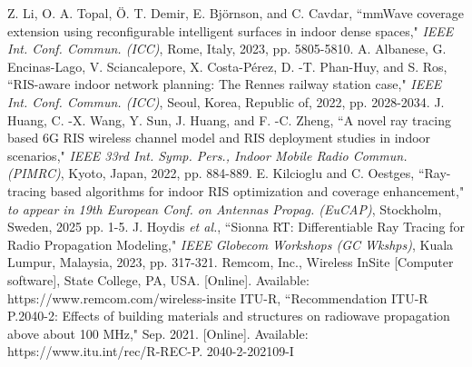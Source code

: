 \documentclass{IEEEoj}
\begin{document}
\begin{thebibliography}{00}
	 Z. Li, O. A. Topal, Ö. T. Demir, E. Björnson, and C. Cavdar, “mmWave coverage extension using reconfigurable intelligent surfaces in indoor dense spaces," \textit{IEEE Int. Conf. Commun. (ICC)}, Rome, Italy, 2023, pp. 5805-5810.
	 A. Albanese, G. Encinas-Lago, V. Sciancalepore, X. Costa-Pérez, D. -T. Phan-Huy, and S. Ros, “RIS-aware indoor network planning: The Rennes railway station case," \textit{IEEE Int. Conf. Commun. (ICC)}, Seoul, Korea, Republic of, 2022, pp. 2028-2034.
	 J. Huang, C. -X. Wang, Y. Sun, J. Huang, and F. -C. Zheng, “A novel ray tracing based 6G RIS wireless channel model and RIS deployment studies in indoor scenarios," \textit{IEEE 33rd Int. Symp. Pers., Indoor Mobile Radio Commun. (PIMRC)}, Kyoto, Japan, 2022, pp. 884-889.
	 E. Kilcioglu and C. Oestges, “Ray-tracing based algorithms for indoor RIS optimization and coverage enhancement," \textit{to appear in 19th European Conf. on Antennas Propag. (EuCAP)}, Stockholm, Sweden, 2025 pp. 1-5.
	 J. Hoydis \textit{et al.}, “Sionna RT: Differentiable Ray Tracing for Radio Propagation Modeling," \textit{IEEE Globecom Workshops (GC Wkshps)}, Kuala Lumpur, Malaysia, 2023, pp. 317-321.
	 Remcom, Inc., Wireless InSite [Computer software], State College, PA, USA. [Online]. Available: https://www.remcom.com/wireless-insite
	 ITU-R, “Recommendation ITU-R P.2040-2: Effects of building materials and structures on radiowave propagation above about 100 MHz," Sep. 2021. [Online]. Available: https://www.itu.int/rec/R-REC-P. 2040-2-202109-I
\end{thebibliography}
\end{document}
